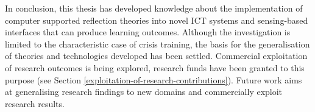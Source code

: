 In conclusion, this thesis has developed knowledge about the implementation of computer supported reflection theories into novel ICT systems and sensing-based interfaces that can produce learning outcomes. Although the investigation is limited to the characteristic case of crisis training, the basis for the generalisation of theories and technologies developed has been settled. Commercial exploitation of research outcomes is being explored, research funds have been granted to this purpose (see Section \ref{exploitation-of-research-contributions}). Future work aims at generalising research findings to new domains and commercially exploit research results. 
